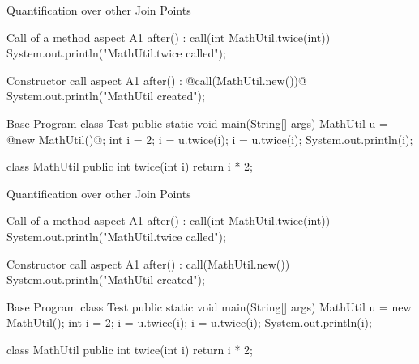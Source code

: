 \begin{frame}[fragile]{Quantification over other Join Points}
	\begin{mycolumns}[widths={50,50},animation=none]
\begin{codetight}{Call of a method}
aspect A1 {
	after() : call(int MathUtil.twice(int)) {
		System.out.println("MathUtil.twice called");
	}
}
\end{codetight}
\begin{codetight}{Constructor call}
aspect A1 {
	after() : @call(MathUtil.new())@ {
		System.out.println("MathUtil created");
	}
}
\end{codetight}
	\mynextcolumn
\begin{codetight}{Base Program}
class Test {
	public static void main(String[] args) {
		MathUtil u = @new MathUtil()@;
		int i = 2;
		i = u.twice(i);
		i = u.twice(i);
		System.out.println(i);
	}
}

class MathUtil {
	public int twice(int i) {
		return i * 2;
	}
}
\end{codetight}	
	\end{mycolumns}
\end{frame}

\begin{frame}[fragile]{Quantification over other Join Points}
	\begin{mycolumns}[widths={50,50},animation=none]
\begin{codetight}{Call of a method}
aspect A1 {
	after() : call(int MathUtil.twice(int)) {
		System.out.println("MathUtil.twice called");
	}
}
\end{codetight}
\begin{codetight}{Constructor call}
aspect A1 {
	after() : call(MathUtil.new()) {
		System.out.println("MathUtil created");
	}
}
\end{codetight}
	\mynextcolumn
\begin{codetight}{Base Program}
class Test {
	public static void main(String[] args) {
		MathUtil u = new MathUtil();
		int i = 2;
		i = u.twice(i);
		i = u.twice(i);
		System.out.println(i);
	}
}

class MathUtil {
	public int twice(int i) {
		return i * 2;
	}
}
\end{codetight}	
	\end{mycolumns}
\end{frame}


